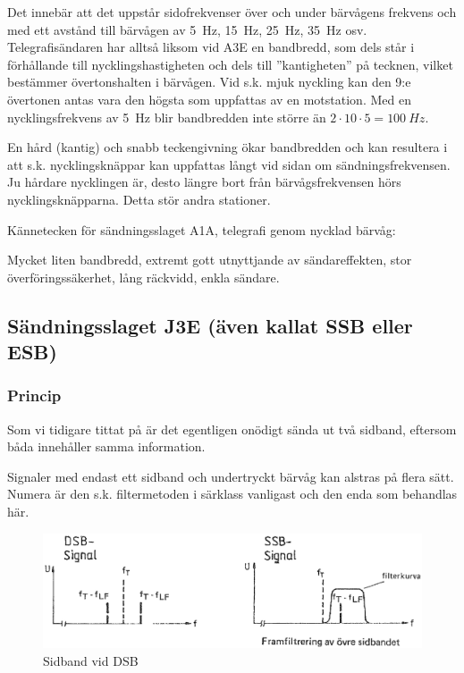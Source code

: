 Det innebär att det uppstår sidofrekvenser över och under bärvågens frekvens och
med ett avstånd till bärvågen av \SI{5}{Hz}, \SI{15}{Hz}, \SI{25}{Hz}, \SI{35}{Hz} osv.
Telegrafisändaren har alltså liksom vid A3E en bandbredd, som dels står i
förhållande till nycklingshastigheten och dels till ''kantigheten'' på tecknen,
vilket bestämmer övertonshalten i bärvågen.
Vid s.k. mjuk nyckling kan den 9:e övertonen antas vara den högsta som
uppfattas av en motstation.
Med en nycklingsfrekvens av \SI{5}{Hz} blir bandbredden inte större än
\(2 \cdot 10 \cdot 5 = 100\ Hz\).

En hård (kantig) och snabb teckengivning ökar bandbredden och kan resultera i
att s.k. nycklingsknäppar kan uppfattas långt vid sidan om sändningsfrekvensen.
Ju hårdare nycklingen är, desto längre bort från bärvågsfrekvensen hörs
nycklingsknäpparna.
Detta stör andra stationer.

Kännetecken för sändningsslaget A1A, telegrafi genom nycklad bärvåg:

Mycket liten bandbredd, extremt gott utnyttjande av sändareffekten, stor
överföringssäkerhet, lång räckvidd, enkla sändare.

\subsection{Sändningsslaget J3E (även kallat SSB eller ESB)}



\subsubsection{Princip}

Som vi tidigare tittat på är det egentligen onödigt sända ut två sidband, eftersom båda innehåller samma information.

Signaler med endast ett sidband och undertryckt bärvåg kan alstras på flera
sätt. Numera är den s.k. filtermetoden i särklass vanligast och den enda som
behandlas här.

\begin{figure}
	\includegraphics[width=\textwidth]{images/cropped_pdfs/bild_2_1-27.pdf}
	\caption{Sidband vid DSB}
	\label{fig:BildII1-27}
\end{figure}

